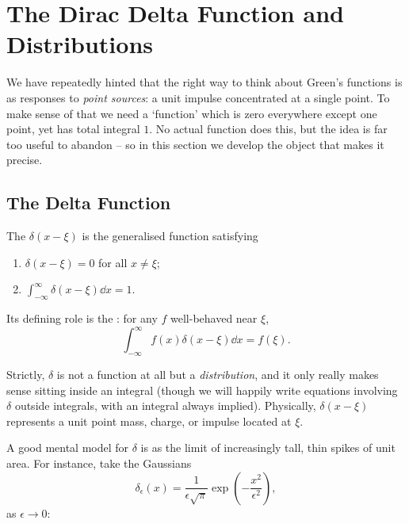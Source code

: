 \section{The Dirac Delta Function and Distributions}

We have repeatedly hinted that the right way to think about Green's functions is as responses to \emph{point sources}: a unit impulse concentrated at a single point. To make sense of that we need a `function' which is zero everywhere except one point, yet has total integral $1$. No actual function does this, but the idea is far too useful to abandon -- so in this section we develop the object that makes it precise.

\subsection{The Delta Function}

\begin{definition}
    The  $\delta(x - \xi)$ is the generalised function satisfying
    \begin{enumerate}[label=(\roman*)]
        \item $\delta(x - \xi) = 0$ for all $x \neq \xi$;
        \item $\int_{-\infty}^{\infty} \delta(x - \xi) \dd x = 1$.
    \end{enumerate}
    Its defining role is the : for any $f$ well-behaved near $\xi$,
    $$
    \int_{-\infty}^{\infty} f(x) \delta(x - \xi) \dd x = f(\xi).
    $$
\end{definition}

Strictly, $\delta$ is not a function at all but a \emph{distribution}, and it only really makes sense sitting inside an integral (though we will happily write equations involving $\delta$ outside integrals, with an integral always implied). Physically, $\delta(x - \xi)$ represents a unit point mass, charge, or impulse located at $\xi$.

A good mental model for $\delta$ is as the limit of increasingly tall, thin spikes of unit area. For instance, take the Gaussians
$$
\delta_\epsilon(x) = \frac{1}{\epsilon \sqrt{\pi}} \exp\left(-\frac{x^2}{\epsilon^2}\right),
$$
as $\epsilon \rightarrow 0$:

